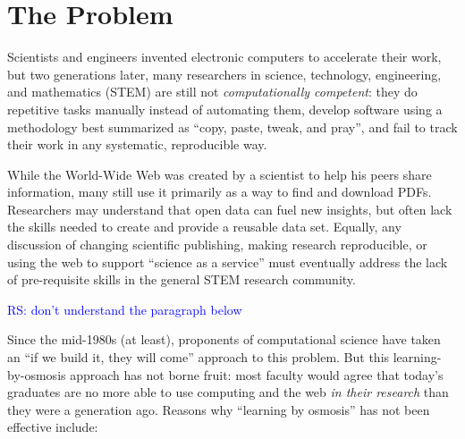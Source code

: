 \documentclass{proposalnsf}
\newlength{\up}
\newcommand{\comment}[1]{\textcolor{blue}{ #1 }}
\begin{document}
\section{The Problem}

Scientists and engineers invented electronic computers to accelerate
their work, but two generations later, many researchers in science,
technology, engineering, and mathematics (STEM) are still not
\emph{computationally competent}: they do repetitive tasks manually
instead of automating them, develop software using a methodology best
summarized as ``copy, paste, tweak, and pray'', and fail to track
their work in any systematic, reproducible way.

While the World-Wide Web was created by a scientist to help his
peers share information, many still use it primarily as a way to find
and download PDFs.  Researchers may understand that open data can fuel
new insights, but often lack the skills needed to create and provide a
reusable data set.  Equally, any discussion of changing scientific
publishing, making research reproducible, or using the web to support
``science as a service'' must eventually address the lack of
pre-requisite skills in the general STEM research community.

\comment{RS: don't understand the paragraph below}

Since the mid-1980s (at least), proponents of computational science
have taken an ``if we build it, they will come'' approach to this
problem.  But this learning-by-osmosis approach has not borne fruit:
most faculty would agree that today's graduates are no more able to
use computing and the web \emph{in their research} than they were a
generation ago.  Reasons why ``learning by osmosis'' has not been
effective include:
\end{document}
